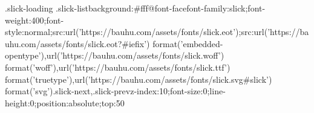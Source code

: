 {{{{{.slick-loading .slick-list{background:#fff}@font-face{font-family:slick;font-weight:400;font-style:normal;src:url('https://bauhu.com/assets/fonts/slick.eot');src:url('https://bauhu.com/assets/fonts/slick.eot?#iefix') format('embedded-opentype'),url('https://bauhu.com/assets/fonts/slick.woff') format('woff'),url('https://bauhu.com/assets/fonts/slick.ttf') format('truetype'),url('https://bauhu.com/assets/fonts/slick.svg#slick') format('svg')}.slick-next,.slick-prev{z-index:10;font-size:0;line-height:0;position:absolute;top:50%
}}}}}}
